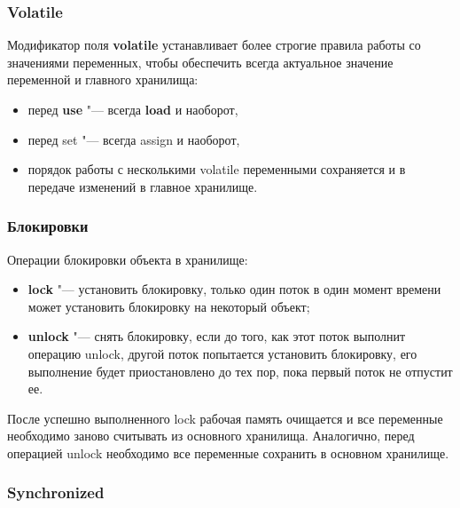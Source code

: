 \documentclass[default]{beamer}
\begin{document}
	\begin{frame}
		\frametitle{Volatile}
		
		Модификатор поля \textbf{volatile} устанавливает более строгие правила работы со значениями переменных, чтобы обеспечить всегда актуальное значение переменной и главного хранилища:
		\begin{itemize}
			\item перед \textbf{use} "--- всегда \textbf{load} и наоборот,
			\item перед set "--- всегда assign и наоборот,
			\item порядок работы с несколькими volatile переменными сохраняется и в передаче изменений в главное хранилище.
		\end{itemize}
	\end{frame}
	\begin{frame}
		\frametitle{Блокировки}
		
		Операции блокировки объекта в хранилище:
		\begin{itemize}
			\item \textbf{lock} "--- установить блокировку, только один поток в один момент времени может установить блокировку на некоторый объект;
			\item \textbf{unlock} "--- снять блокировку, если до того, как этот поток выполнит операцию unlock, другой поток попытается установить блокировку, его выполнение будет приостановлено до тех пор, пока первый поток не отпустит ее.
		\end{itemize}
		
		После успешно выполненного lock рабочая память очищается и все переменные необходимо заново считывать из основного хранилища. Аналогично, перед операцией unlock необходимо все переменные сохранить в основном хранилище.
	\end{frame}
	
	\begin{frame}
		\frametitle{Synchronized}

		\lstSynch
				
	\end{frame}
	
\end{document}
